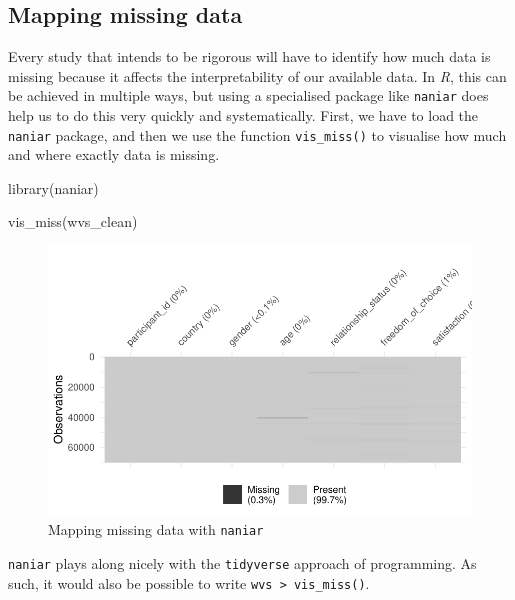 \documentclass[
  letterpaper,
]{krantz}
\makeatletter
\newenvironment{Shaded}{\begin{snugshade}}{\end{snugshade}}
\newcommand{\FunctionTok}[1]{\textcolor[rgb]{0.28,0.35,0.67}{#1}}
\newcommand{\NormalTok}[1]{\textcolor[rgb]{0.00,0.23,0.31}{#1}}
\newenvironment{kframe}{%
\medskip{}
\setlength{\fboxsep}{.8em}
 \def\at@end@of@kframe{}%
 \ifinner\ifhmode%
  \def\at@end@of@kframe{\end{minipage}}%
  \begin{minipage}{\columnwidth}%
 \fi\fi%
 \def\FrameCommand##1{\hskip\@totalleftmargin \hskip-\fboxsep
 \colorbox{shadecolor}{##1}\hskip-\fboxsep
     \hskip-\linewidth \hskip-\@totalleftmargin \hskip\columnwidth}%
 \MakeFramed {\advance\hsize-\width
   \@totalleftmargin\z@ \linewidth\hsize
   \@setminipage}}%
 {\par\unskip\endMakeFramed%
 \at@end@of@kframe}
\renewenvironment{Shaded}{\begin{kframe}}{\end{kframe}}
\makeatother
\begin{document}
\subsection{Mapping missing data}\label{sec-mapping-missing-data}

Every study that intends to be rigorous will have to identify how much
data is missing because it affects the interpretability of our available
data. In \emph{R}, this can be achieved in multiple ways, but using a
specialised package like \texttt{naniar} does help us to do this very
quickly and systematically. First, we have to load the \texttt{naniar}
package, and then we use the function \texttt{vis\_miss()} to visualise
how much and where exactly data is missing.

\begin{Shaded}
\begin{Highlighting}[]
\FunctionTok{library}\NormalTok{(naniar)}

\FunctionTok{vis\_miss}\NormalTok{(wvs\_clean)}
\end{Highlighting}
\end{Shaded}

\begin{figure}[H]

{\centering \includegraphics{07_data_wrangling_files/figure-pdf/mapping-missing-data-1.pdf}

}

\caption{Mapping missing data with \texttt{naniar}}

\end{figure}%

\texttt{naniar} plays along nicely with the \texttt{tidyverse} approach
of programming. As such, it would also be possible to write
\texttt{wvs\ \textbar{}\textgreater{}\ vis\_miss()}.
\end{document}
